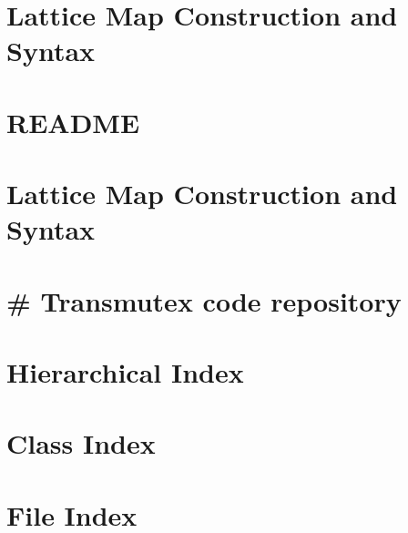 \documentclass[twoside]{book}
\newcommand{\+}{\discretionary{\mbox{\scriptsize$\hookleftarrow$}}{}{}}
\begin{document}
\chapter{Lattice Map Construction and Syntax}
\label{md___users__transmutex__simulation__a_d_s__simulation_code__benchmark_4_src_lattice_map__r_e_a_d_m_e}

\chapter{README}
\label{md___users__transmutex__simulation__a_d_s__simulation_code__dockerfiles__r_e_a_d_m_e}

\chapter{Lattice Map Construction and Syntax}
\label{md___users__transmutex__simulation__a_d_s__simulation_code__g4__neutron_transport_src_lattice_map__r_e_a_d_m_e}

\chapter{\# Transmutex code repository}
\label{md___users__transmutex__simulation__a_d_s__simulation_code__r_e_a_d_m_e}

\chapter{Hierarchical Index}

\chapter{Class Index}

\chapter{File Index}

\end{document}
